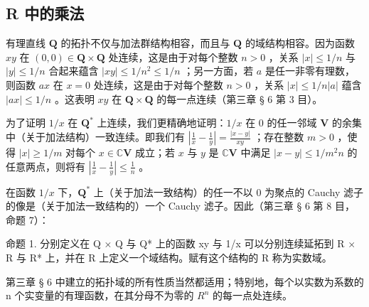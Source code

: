 \subsection{R 中的乘法}

有理直线 \(\mathbf{Q}\) 的拓扑不仅与加法群结构相容，而且与 \(\mathbf{Q}\) 的域结构相容。因为函数 \(xy\) 在 \((0, 0) \in \mathbf{Q} \times \mathbf{Q}\) 处连续，这是由于对每个整数 \(n > 0\) ，关系 \(|x| \leqslant 1/n\) 与 \(|y| \leqslant 1/n\) 合起来蕴含 \(|xy| \leqslant 1/n^2 \leqslant 1/n\) ；另一方面，若 \(a\) 是任一非零有理数，则函数 \(ax\) 在 \(x = 0\) 处连续，这是由于对每个整数 \(n > 0\) ，关系 \(|x| \leqslant 1/n |a|\) 蕴含 \(|ax| \leqslant 1/n\) 。这表明 \(xy\) 在 \(\mathbf{Q} \times \mathbf{Q}\) 的每一点连续（第三章 § 6 第 3 目）。

为了证明 \(1 / x\) 在 \(\mathbf{Q}^*\) 上连续，我们更精确地证明：\(1 / x\) 在 0 的任一邻域 \(\mathbf{V}\) 的余集中（关于加法结构）一致连续。即我们有 \(\left|\frac{1}{x} - \frac{1}{y}\right| = \frac{|x - y|}{xy}\) ；存在整数 \(m > 0\) ，使得 \(|x| \geqslant 1 / m\) 对每个 \(x \in \mathbb{C}\mathbf{V}\) 成立；若 \(x\) 与 \(y\) 是 \(\mathbb{C}\mathbf{V}\) 中满足 \(|x - y| \leqslant 1 / m^2 n\) 的任意两点，则将有 \(\left|\frac{1}{x} - \frac{1}{y}\right| \leqslant \frac{1}{n}\) 。

在函数 \(1 / x\) 下，\(\mathbf{Q}^*\) 上（关于加法一致结构）的任一不以 \(0\) 为聚点的 Cauchy 滤子的像是（关于加法一致结构的）一个 Cauchy 滤子。因此（第三章 § 6 第 8 目，命题 7）：

命题 1. 分别定义在 Q × Q 与 Q* 上的函数 xy 与 1/x 可以分别连续延拓到 R × R 与 R* 上，并在 R 上定义一个域结构。赋有这个结构的 R 称为实数域。

第三章 § 6 中建立的拓扑域的所有性质当然都适用；特别地，每个以实数为系数的 n 个实变量的有理函数，在其分母不为零的 \(R^{n}\) 的每一点处连续。

